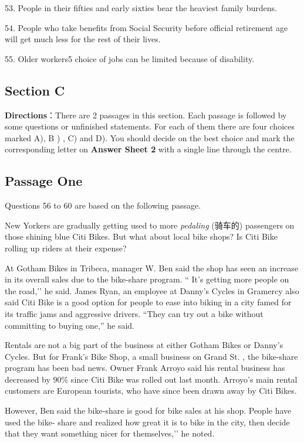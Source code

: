 \documentclass[UTF8,11pt]{ctexart}
\begin{document}
53. People in their fifties and early sixties bear the heaviest family burdens.


54. People who take benefits from Social Security before official retirement age will get much less for the rest of their lives.


55. Older workers5 choice of jobs can be limited because of disability.


\subsection*{\textbf{Section C}}


\textbf{Directions}：There are 2 passages in this section. Each passage is followed by some questions or unfinished statements. For each of them there are four choices marked A), B ) , C) and D). You should decide on the best choice and mark the corresponding letter on\textbf{ Answer Sheet 2} with a single line through the centre.


\subsection*{\textbf{Passage One}}


Questions 56 to 60 are based on the following passage.


New Yorkers are gradually getting used to more\textit{ pedaling} (骑车的) passengers on those shining blue Citi Bikes. But what about local bike shops? Is Citi Bike rolling up riders at their expense?


At Gotham Bikes in Tribeca, manager W. Ben said the shop has seen an increase in its overall sales due to the bike-share program. “ It’s getting more people on the road,’’ he said. James Ryan, an employee at Danny’s Cycles in Gramercy also said Citi Bike is a good option for people to ease into biking in a city famed for its traffic jams and aggressive drivers. “They can try out a bike without committing to buying one,” he said.


Rentals are not a big part of the business at either Gotham Bikes or Danny’s Cycles. But for Frank’s Bike Shop, a small business on Grand St. , the bike-share program has been bad news. Owner Frank Arroyo said his rental business has decreased by 90\% since Citi Bike was rolled out last month. Arroyo’s main rental customers are European tourists, who have since been drawn away by Citi Bikes.


However, Ben said the bike-share is good for bike sales at his shop. People have used the bike- share and realized how great it is to bike in the city, then decide that they want something nicer for themselves,’’ he noted.
\end{document}
